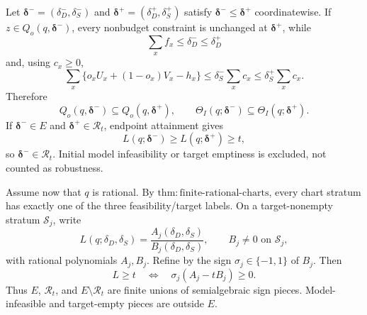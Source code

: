 Let \(\boldsymbol\delta^-=(\delta_D^-,\delta_S^-)\) and \(\boldsymbol\delta^+=(\delta_D^+,\delta_S^+)\) satisfy \(\boldsymbol\delta^-\leq\boldsymbol\delta^+\) coordinatewise. If \(z\in Q_o(q,\boldsymbol\delta^-)\), every nonbudget constraint is unchanged at \(\boldsymbol\delta^+\), while
\[
 \sum_x f_x\leq\delta_D^-\leq\delta_D^+
\]
and, using \(c_x\geq0\),
\[
 \sum_x\{o_xU_x+(1-o_x)V_x-h_x\}
 \leq\delta_S^-\sum_xc_x
 \leq\delta_S^+\sum_xc_x.
\]
Therefore
\[
 Q_o(q,\boldsymbol\delta^-)
 \subseteq Q_o(q,\boldsymbol\delta^+),
 \qquad
 \Theta_I(q;\boldsymbol\delta^-)
 \subseteq\Theta_I(q;\boldsymbol\delta^+).
\]
If \(\boldsymbol\delta^-\in E\) and \(\boldsymbol\delta^+\in\mathcal R_t\), endpoint attainment gives
\[
 L(q;\boldsymbol\delta^-)
 \geq L(q;\boldsymbol\delta^+)
 \geq t,
\]
so \(\boldsymbol\delta^-\in\mathcal R_t\). Initial model infeasibility or target emptiness is excluded, not counted as robustness.

Assume now that \(q\) is rational. By \(\mathrm{thm:finite\text{-}rational\text{-}charts}\), every chart stratum has exactly one of the three feasibility/target labels. On a target-nonempty stratum \(\mathcal S_j\), write
\[
 L(q;\delta_D,\delta_S)
 =\frac{A_j(\delta_D,\delta_S)}{B_j(\delta_D,\delta_S)},
 \qquad B_j\neq0\text{ on }\mathcal S_j,
\]
with rational polynomials \(A_j,B_j\). Refine by the sign \(\sigma_j\in\{-1,1\}\) of \(B_j\). Then
\[
 L\geq t
 \quad\Longleftrightarrow\quad
 \sigma_j(A_j-tB_j)\geq0.
\]
Thus \(E\), \(\mathcal R_t\), and \(E\setminus\mathcal R_t\) are finite unions of semialgebraic sign pieces. Model-infeasible and target-empty pieces are outside \(E\).

